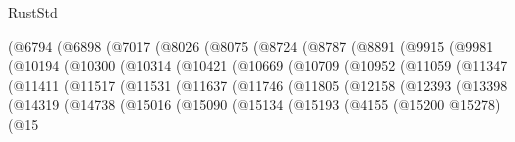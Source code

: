 \begin{lexlean}{RustStd}
\begin{coremodule}
                        (@6794
                          (@6898
                            (@7017
                              (@8026
                                (@8075
                                  (@8724
                                    (@8787
                                      (@8891
                                        (@9915
                                          (@9981
                                            (@10194
                                              (@10300
                                                (@10314
                                                  (@10421
                                                    (@10669
                                                      (@10709
                                                        (@10952
                                                          (@11059
                                                            (@11347
                                                              (@11411
                                                                (@11517
                                                                  (@11531
                                                                    (@11637
                                                                      (@11746
                                                                        (@11805
                                                                          (@12158
                                                                            (@12393
                                                                              (@13398
                                                                                (@14319
                                                                                  (@14738
                                                                                    (@15016
                                                                                      (@15090
                                                                                        (@15134
                                                                                          (@15193
                                                                                            (@4155
                                                                                              (@15200
                                                                                                @15278)
                                                                                              (@15

\end{coremodule}
\end{lexlean}

